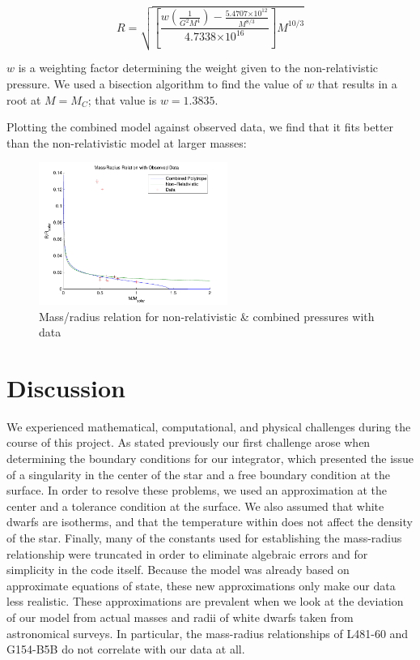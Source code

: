 \documentclass[twoside]{article}
\providecommand{\e}[1]{\ensuremath{\times 10^{#1}}} %
\begin{document}
\begin{multicols}{2}
\begin{equation}
    \label{eq:mixedmr}
    R = \sqrt{ \left[ \frac{ w \left( \frac{1}{G^2 M^4}\right) -
    \frac{5.4707\e{12}}{M^{8/3}}}{4.7338\e{16}}\right]M^{10/3} }
\end{equation}

\(w\) is a weighting factor determining the weight given to the non-relativistic
pressure. We used a bisection algorithm to find the value of \(w\) that results in a root
at \(M=M_C\); that value is \(w=1.3835\).

Plotting the combined model against observed data, we find that it fits better
than the non-relativistic model at larger masses:

\begin{figure}[H]
    \caption{Mass/radius relation for non-relativistic \& combined pressures
    with data}
    \includegraphics[width=0.55\textwidth]{mr_data_fixed.pdf}
\end{figure}


\section{Discussion}

    We experienced mathematical, computational, and physical challenges during
    the course of this project. As stated previously our first challenge arose
    when determining the boundary conditions for our integrator, which presented
    the issue of a singularity in the center of the star and a free boundary
    condition at the surface. In order to resolve these problems, we used an
    approximation at the center and a tolerance condition at the surface. We
    also assumed that white dwarfs are isotherms, and that the temperature
    within does not affect the density of the star. Finally, many of the
    constants used for establishing the mass-radius relationship were truncated
    in order to eliminate algebraic errors and for simplicity in the code
    itself. Because the model was already based on approximate equations of
    state, these new approximations only make our data less realistic. These
    approximations are prevalent when we look at the deviation of our model from
    actual masses and radii of white dwarfs taken from astronomical surveys. In
    particular, the mass-radius relationships of L481-60 and G154-B5B do not
    correlate with our data at all. 


\end{multicols}
\end{document}
